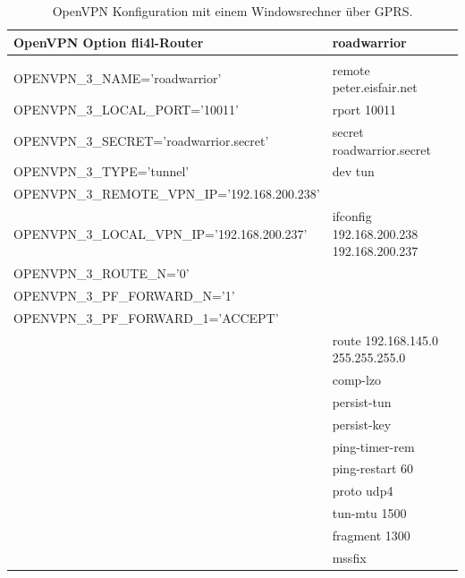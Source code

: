 \begin{table}[htbp]
  \begin{scriptsize}
    \begin{tabular}{ll}
      OpenVPN Option fli4l-Router                   & roadwarrior           \\
      \hline \\
      OPENVPN\_3\_NAME='roadwarrior'                & remote peter.eisfair.net \\
      OPENVPN\_3\_LOCAL\_PORT='10011'               & rport 10011 \\
      OPENVPN\_3\_SECRET='roadwarrior.secret'       & secret roadwarrior.secret \\
      OPENVPN\_3\_TYPE='tunnel'                     & dev tun \\
      OPENVPN\_3\_REMOTE\_VPN\_IP='192.168.200.238' & ~ \\
      OPENVPN\_3\_LOCAL\_VPN\_IP='192.168.200.237'  & ifconfig 192.168.200.238 192.168.200.237 \\
      OPENVPN\_3\_ROUTE\_N='0'                      & ~ \\
      OPENVPN\_3\_PF\_FORWARD\_N='1'              & ~ \\
      OPENVPN\_3\_PF\_FORWARD\_1='ACCEPT' & ~ \\
      ~                                             & route 192.168.145.0 255.255.255.0 \\
      ~                                             & comp-lzo \\
      ~                                             & persist-tun \\
      ~                                             & persist-key \\
      ~                                             & ping-timer-rem \\
      ~                                             & ping-restart 60 \\
      ~                                             & proto udp4 \\
      ~                                             & tun-mtu 1500 \\
      ~                                             & fragment 1300 \\
      ~                                             & mssfix \\
    \end{tabular}
  \end{scriptsize}
  \caption{OpenVPN Konfiguration mit einem Windowsrechner über GPRS.}
\end{table}

